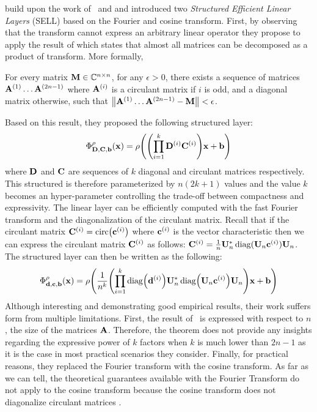 \citet{moczulski2016acdc} build upon the work of~\citet{cheng2015exploration} and \citet{huhtanen2015factoring} and introduced two \emph{Structured Efficient Linear Layers} (SELL) based on the Fourier and cosine transform.
First, by observing that the \DC transform cannot express an arbitrary linear operator they propose to apply the result of \citet{huhtanen2015factoring} which states that almost all matrices can be decomposed as a product of \DC transform.
More formally, 
\begin{theorem}
  For every matrix $\mathbf{M} \in \mathbb{C}^{n \times n}$, for any $\epsilon > 0$, there exists a sequence of matrices $\mathbf{A}^{(1)} \ldots \mathbf{A}^{(2n-1)}$ where $\mathbf{A}^{(i)}$ is a circulant matrix if $i$ is odd, and a diagonal matrix otherwise, such that $\norm{\mathbf{A}^{(1)} \ldots \mathbf{A}^{(2n-1)} - \mathbf{M}} < \epsilon$.
  \label{theorem:ch3-huhtanen}
\end{theorem}
\noindent
Based on this result, they proposed the following structured layer:
\begin{equation}
  \Phi^\rho_{\Dmat, \Cmat, \bvec} (\xvec) = \rho \left( \left(\prod_{i = 1}^{k} \Dmat^{(i)} \Cmat^{(i)} \right) \xvec + \bvec \right)
\end{equation}
where $\mathbf{D}$ and $\mathbf{C}$ are sequences of $k$ diagonal and circulant matrices respectively.
This structured is therefore parameterized by $n(2k+1)$ values and the value $k$ becomes an hyper-parameter controlling the trade-off between compactness and expressivity. 
The linear layer can be efficiently computed with the fast Fourier transform and the diagonalization of the circulant matrix. 
Recall that if the circulant matrix $\Cmat^{(i)} =  \circulant\left(\cvec^{(i)}\right)$ where $\mathbf{c}^{(i)}$ is the vector characteristic then we can express the circulant matrix $\mathbf{C}^{(i)}$ as follows: $\mathbf{C}^{(i)} = \frac{1}{n} \mathbf{U}_n^* \operatorname*{diag}(\mathbf{U}_n \mathbf{c}^{(i)}) \mathbf{U}_n$.
The structured layer can then be written as the following:
\begin{equation}
  \Phi^\rho_{\dvec, \cvec, \bvec} (\xvec) = \rho \left(\frac{1}{n^k} \left(\prod_{i = 1}^{k} \diag\left(\dvec^{(i)}\right) \Umat_n^* \diag\left(\Umat_n \cvec^{(i)}\right) \Umat_n \right) \xvec + \bvec \right)
\end{equation}
\noindent
Although interesting and demonstrating good empirical results, their work suffers form from multiple limitations. 
First, the result of~\citet{huhtanen2015factoring} is expressed with respect to $n$, the size of the matrices $\mathbf{A}$.
Therefore, the theorem does not provide any insights regarding the expressive power of $k$ factors when $k$ is much lower than $2n-1$ as it is the case in most practical scenarios they consider.
Finally, for practical reasons, they replaced the Fourier transform with the cosine transform.
As far as we can tell, the theoretical guarantees available with the Fourier Transform do not apply to the cosine transform because the cosine transform does not diagonalize circulant matrices \cite{sanchez1995diagonalizing}.



